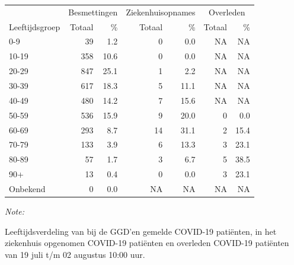 \documentclass[
  english,
  man,floatsintext]{apa6}
\begin{document}
\begin{table}[H]
\centering\begingroup\fontsize{11}{13}\selectfont

\begin{threeparttable}
\begin{tabular}{lrrrrrr}
\toprule
\multicolumn{1}{c}{ } & \multicolumn{2}{c}{Besmettingen} & \multicolumn{2}{c}{Ziekenhuisopnames} & \multicolumn{2}{c}{Overleden} \\
\cmidrule(l{3pt}r{3pt}){2-3} \cmidrule(l{3pt}r{3pt}){4-5} \cmidrule(l{3pt}r{3pt}){6-7}
Leeftijdsgroep & Totaal & \% & Totaal & \% & Totaal & \%\\
\midrule
0-9 & 39 & 1.2 & 0 & 0.0 & NA & NA\\
10-19 & 358 & 10.6 & 0 & 0.0 & NA & NA\\
20-29 & 847 & 25.1 & 1 & 2.2 & NA & NA\\
30-39 & 617 & 18.3 & 5 & 11.1 & NA & NA\\
40-49 & 480 & 14.2 & 7 & 15.6 & NA & NA\\
50-59 & 536 & 15.9 & 9 & 20.0 & 0 & 0.0\\
60-69 & 293 & 8.7 & 14 & 31.1 & 2 & 15.4\\
70-79 & 133 & 3.9 & 6 & 13.3 & 3 & 23.1\\
80-89 & 57 & 1.7 & 3 & 6.7 & 5 & 38.5\\
90+ & 13 & 0.4 & 0 & 0.0 & 3 & 23.1\\
Onbekend & 0 & 0.0 & NA & NA & NA & NA\\
\bottomrule
\end{tabular}
\begin{tablenotes}
\item \textit{Note: } 
\item Leeftijdsverdeling van bij de GGD’en gemelde COVID-19 patiënten, in het ziekenhuis opgenomen COVID-19 patiënten en overleden COVID-19 patiënten van 19 juli t/m 02 augustus 10:00 uur.
\end{tablenotes}
\end{threeparttable}
\endgroup{}
\end{table}
\end{document}
